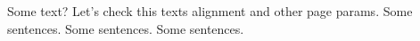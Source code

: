\documentclass{information_retrieval_lab}
\begin{document}


\newcommand{\labNo}{1}

\newcommand{\labTopic}{Lab Topic}



Some text? Let's check this texts alignment and other page params. Some sentences. Some sentences. Some sentences.
\end{document}
